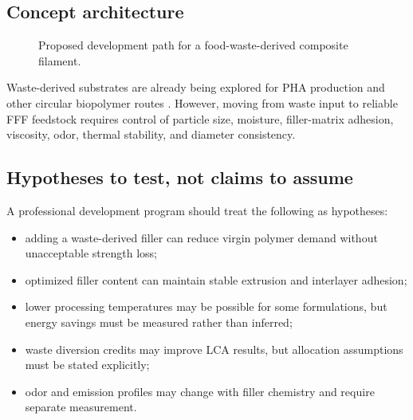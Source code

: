 \documentclass[11pt]{article}
\begin{document}
\subsection{Concept architecture}

\begin{figure}[htbp]
\centering
{}
\caption{Proposed development path for a food-waste-derived composite filament.}
\end{figure}

Waste-derived substrates are already being explored for PHA production and other circular biopolymer routes \cite{zhou2023,getino2024}. However, moving from waste input to reliable FFF feedstock requires control of particle size, moisture, filler-matrix adhesion, viscosity, odor, thermal stability, and diameter consistency.

\subsection{Hypotheses to test, not claims to assume}

A professional development program should treat the following as hypotheses:

\begin{itemize}
  \item adding a waste-derived filler can reduce virgin polymer demand without unacceptable strength loss;
  \item optimized filler content can maintain stable extrusion and interlayer adhesion;
  \item lower processing temperatures may be possible for some formulations, but energy savings must be measured rather than inferred;
  \item waste diversion credits may improve LCA results, but allocation assumptions must be stated explicitly;
  \item odor and emission profiles may change with filler chemistry and require separate measurement.
\end{itemize}
\end{document}
